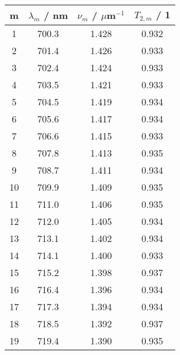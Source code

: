 \begin{tabular}{cccc}
m & $\lambda_m$ / nm & $\nu_m$ / $\mu$m${}^{-1}$ & $T_{2,m}$ / 1 \\
\hline1 & 700.3 & 1.428 & 0.932\\
2 & 701.4 & 1.426 & 0.933\\
3 & 702.4 & 1.424 & 0.933\\
4 & 703.5 & 1.421 & 0.933\\
5 & 704.5 & 1.419 & 0.934\\
6 & 705.6 & 1.417 & 0.934\\
7 & 706.6 & 1.415 & 0.933\\
8 & 707.8 & 1.413 & 0.935\\
9 & 708.7 & 1.411 & 0.934\\
10 & 709.9 & 1.409 & 0.935\\
11 & 711.0 & 1.406 & 0.935\\
12 & 712.0 & 1.405 & 0.934\\
13 & 713.1 & 1.402 & 0.934\\
14 & 714.1 & 1.400 & 0.933\\
15 & 715.2 & 1.398 & 0.937\\
16 & 716.4 & 1.396 & 0.934\\
17 & 717.3 & 1.394 & 0.934\\
18 & 718.5 & 1.392 & 0.937\\
19 & 719.4 & 1.390 & 0.935\\
\end{tabular}
